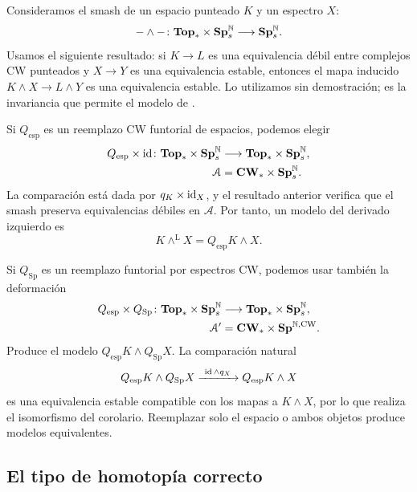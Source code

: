\begin{ejem}
Consideramos el smash de un espacio punteado $K$ y un espectro $X$:
\[
-\wedge-\colon\mathbf{Top}_*\times\mathbf{Sp}^{\mathbb N}_s\longrightarrow\mathbf{Sp}^{\mathbb N}_s.
\]
Usamos el siguiente resultado: si $K\to L$ es una equivalencia débil entre complejos CW punteados y $X\to Y$ es una equivalencia estable, entonces el mapa inducido $K\wedge X\to L\wedge Y$ es una equivalencia estable. Lo utilizamos sin demostración; es la invariancia que permite el modelo de \cite[Ejemplo~3.4.3.4]{malkiewich}.

Si $Q_{\mathrm{esp}}$ es un reemplazo CW funtorial de espacios, podemos elegir
\[
\begin{aligned}
Q_{\mathrm{esp}}\times\operatorname{id}\colon
\mathbf{Top}_*\times\mathbf{Sp}^{\mathbb N}_s
&\longrightarrow\mathbf{Top}_*\times\mathbf{Sp}^{\mathbb N}_s,\\
\mathcal A&=\mathbf{CW}_*\times\mathbf{Sp}^{\mathbb N}_s.
\end{aligned}
\]
La comparación está dada por $q_K\times\operatorname{id}_X$, y el resultado anterior verifica que el smash preserva equivalencias débiles en $\mathcal A$. Por tanto, un modelo del derivado izquierdo es
\[
K\wedge^{\mathrm L}X=Q_{\mathrm{esp}}K\wedge X.
\]

Si $Q_{\mathrm{Sp}}$ es un reemplazo funtorial por espectros CW, podemos usar también la deformación
\[
\begin{aligned}
Q_{\mathrm{esp}}\times Q_{\mathrm{Sp}}\colon
\mathbf{Top}_*\times\mathbf{Sp}^{\mathbb N}_s
&\longrightarrow\mathbf{Top}_*\times\mathbf{Sp}^{\mathbb N}_s,\\
\mathcal A'&=\mathbf{CW}_*\times\mathbf{Sp}^{\mathbb N,\mathrm{CW}}.
\end{aligned}
\]
Produce el modelo $Q_{\mathrm{esp}}K\wedge Q_{\mathrm{Sp}}X$. La comparación natural
\[
Q_{\mathrm{esp}}K\wedge Q_{\mathrm{Sp}}X
\xrightarrow{\ \operatorname{id}\wedge q_X\ }
Q_{\mathrm{esp}}K\wedge X
\]
es una equivalencia estable compatible con los mapas a $K\wedge X$, por lo que realiza el isomorfismo del corolario. Reemplazar solo el espacio o ambos objetos produce modelos equivalentes.
\end{ejem}

\subsection{El tipo de homotopía correcto}

